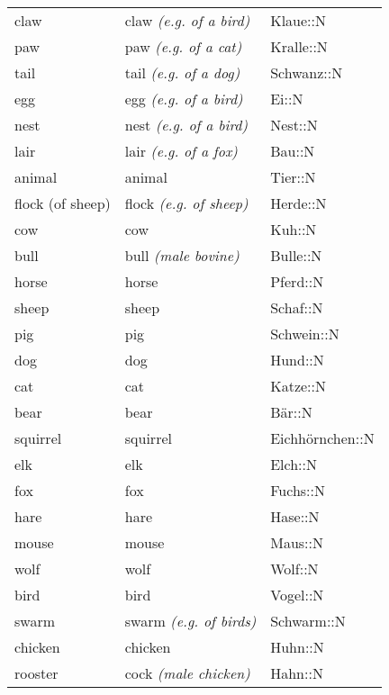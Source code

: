 \begin{center}
\begin{longtable}{lll}
{\sc \lowercase{	CLAW	}}	&	claw	\textit{\footnotesize (e.g. of a bird)}	&	Klaue::N	\\
{\sc \lowercase{	PAW	}}	&	paw	\textit{\footnotesize (e.g. of a cat)}	&	Kralle::N	\\
{\sc \lowercase{	TAIL	}}	&	tail	\textit{\footnotesize (e.g. of a dog)}	&	Schwanz::N	\\
{\sc \lowercase{	EGG	}}	&	egg	\textit{\footnotesize (e.g. of a bird)}	&	Ei::N	\\
{\sc \lowercase{	NEST	}}	&	nest	\textit{\footnotesize (e.g. of a bird)}	&	Nest::N	\\
{\sc \lowercase{	LAIR	}}	&	lair	\textit{\footnotesize (e.g. of a fox)}	&	Bau::N	\\
{\sc \lowercase{	ANIMAL	}}	&	animal		&	Tier::N	\\
{\sc \lowercase{	FLOCK \footnotesize (OF SHEEP)	}}	&	flock	\textit{\footnotesize (e.g. of sheep)}	&	Herde::N	\\
{\sc \lowercase{	COW	}}	&	cow		&	Kuh::N	\\
{\sc \lowercase{	BULL	}}	&	bull	\textit{\footnotesize (male bovine)}	&	Bulle::N	\\
{\sc \lowercase{	HORSE	}}	&	horse		&	Pferd::N	\\
{\sc \lowercase{	SHEEP	}}	&	sheep		&	Schaf::N	\\
{\sc \lowercase{	PIG	}}	&	pig		&	Schwein::N	\\
{\sc \lowercase{	DOG	}}	&	dog		&	Hund::N	\\
{\sc \lowercase{	CAT	}}	&	cat		&	Katze::N	\\
{\sc \lowercase{	BEAR	}}	&	bear		&	Bär::N	\\
{\sc \lowercase{	SQUIRREL	}}	&	squirrel		&	Eichhörnchen::N	\\
{\sc \lowercase{	ELK	}}	&	elk		&	Elch::N	\\
{\sc \lowercase{	FOX	}}	&	fox		&	Fuchs::N	\\
{\sc \lowercase{	HARE	}}	&	hare		&	Hase::N	\\
{\sc \lowercase{	MOUSE	}}	&	mouse		&	Maus::N	\\
{\sc \lowercase{	WOLF	}}	&	wolf		&	Wolf::N	\\
{\sc \lowercase{	BIRD	}}	&	bird		&	Vogel::N	\\
{\sc \lowercase{	SWARM	}}	&	swarm	\textit{\footnotesize (e.g. of birds)}	&	Schwarm::N	\\
{\sc \lowercase{	CHICKEN	}}	&	chicken		&	Huhn::N	\\
{\sc \lowercase{	ROOSTER	}}	&	cock	\textit{\footnotesize (male chicken)}	&	Hahn::N	\\

\end{longtable}
\end{center}
